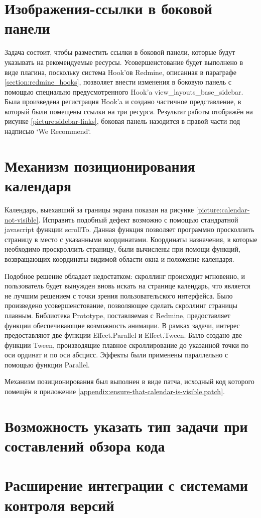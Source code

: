 \section{Изображения-ссылки в боковой панели}
Задача состоит, чтобы разместить ссылки в боковой панели, которые будут
указывать на рекомендуемые ресурсы. Усовершенстование будет выполнено в виде
плагина, поскольку система Hook'ов Redmine, описанная в параграфе
\ref{section:redmine_hooks}, позволяет внести изменения в боковую панель с
помощью специально предусмотренного Hook'a view\_layouts\_base\_sidebar.
Была произведена регистрация Hook'a и создано частичное представление, в
который были помещены ссылки на три ресурса. Результат работы отображён на
рисунке \ref{picture:sidebar-links}, боковая панель назодится в правой части
под надписью `We Recommend`.










\section{Механизм позиционирования календаря}
Календарь, выехавший за границы экрана показан на рисунке
\ref{picture:calendar-not-visible}. Исправить подобный дефект возможно с
помощью стандратной javascript функции scrollTo. Данная функция позволяет
программно просколлить страницу в место с указанными координатами. Координаты
назначения, в которые необходимо проскроллить страницу, были вычислены при
помощи функций, возвращающих координаты видимой области окна и положение
календаря.

Подобное решение обладает недостатком: скроллинг происходит мгновенно, и
пользователь будет вынужден вновь искать на странице календарь, что является не
лучшим решением с точки зрения пользовательского интерфейса. Было произведено
усовершенстование, позволяющее сделать скроллинг страницы плавным.
Библиотека Prototype, поставляемая с Redmine, предоставляет функции
обеспечивающие возможность анимации. В рамках задачи, интерес предоставляют две
функции Effect.Parallel и Effect.Tween. Было создано две функции Tween,
производящие плавное скроллирование до указанной точки по оси ординат и по оси
абсцисс. Эффекты были применены параллельно с помощью функции Parallel.

Механизм позиционирования был выполнен в виде патча, исходный код которого
помещён в приложение \ref{appendix:ensure-that-calendar-is-visible.patch}.



\section{Возможность указать тип задачи при составлений обзора кода}




\section{Расширение интеграции с системами контроля версий}









